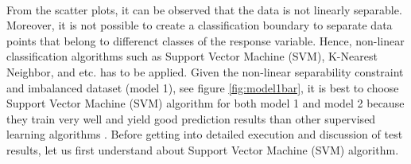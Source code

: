 \documentclass[format=sigconf]{acmart}
\begin{document}
\hfill\\
From the scatter plots, it can be observed that the data is not linearly separable. Moreover, it is not possible to create a classification 
boundary to separate data points that belong to differenct classes of the response variable. Hence, non-linear classification 
algorithms such as Support Vector Machine (SVM), K-Nearest Neighbor, and etc. has to be applied. Given the non-linear 
separability constraint and imbalanced dataset (model 1), see figure \ref{fig:model1bar}, it is best to choose Support Vector Machine (SVM) 
algorithm for both model 1 and model 2 because they train very well and yield good prediction results than other supervised learning 
algorithms \cite{imam2006z}. Before getting into detailed execution and discussion of test results, let us first understand about 
Support Vector Machine (SVM) algorithm.


\end{document}
